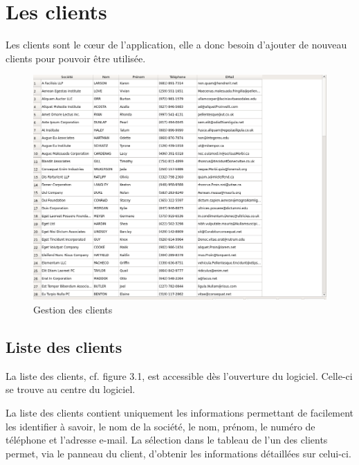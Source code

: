 \chapter{Les clients}
Les clients sont le cœur de l'application, elle a donc besoin d'ajouter de nouveau clients pour pouvoir être utilisée. 
\begin{figure}[H]
	\centering
	\includegraphics[width=12cm]{screens/clients.png}
	\caption{Gestion des clients}
\end{figure}

\section{Liste des clients}
La liste des clients, cf. figure 3.1, est accessible dès l’ouverture du logiciel. Celle-ci se trouve au centre du logiciel. 

La liste des clients contient uniquement les informations permettant de facilement les identifier à savoir, le nom de la société, le nom,
prénom, le numéro de téléphone et l’adresse e-mail. La sélection dans le tableau de l’un des clients permet, via le panneau du client,
d’obtenir les informations détaillées sur celui-ci. 

